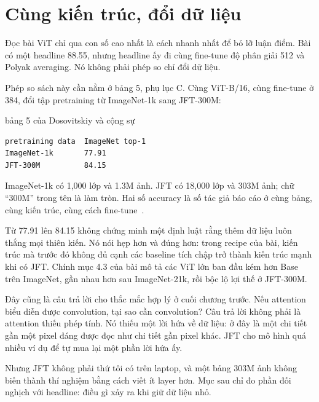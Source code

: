 \section{Cùng kiến trúc, đổi dữ liệu}
\label{sec:ch11-hai-nua-cua-bang}

%
Đọc bài ViT chỉ qua con số cao nhất là cách nhanh nhất để bỏ lỡ luận điểm. Bài
có một headline 88.55, nhưng headline ấy đi cùng fine-tune độ phân giải 512 và
Polyak averaging. Nó không phải phép so chỉ đổi dữ liệu.

Phép so sách này cần nằm ở bảng 5, phụ lục C. Cùng ViT-B/16, cùng fine-tune ở
384, đổi tập pretraining từ ImageNet-1k sang JFT-300M:

\begin{bridge}{bảng 5 của Dosovitskiy và cộng sự}
\begin{verbatim}
pretraining data  ImageNet top-1
ImageNet-1k       77.91
JFT-300M          84.15
\end{verbatim}

ImageNet-1k có 1,000 lớp và 1.3M ảnh. JFT có 18,000 lớp và 303M ảnh; chữ
\enquote{300M} trong tên là làm tròn. Hai số accuracy là số tác giả báo cáo ở
cùng bảng, cùng kiến trúc, cùng cách fine-tune~\autocite{dosovitskiy2021vit}.
\end{bridge}

Từ 77.91 lên 84.15 không chứng minh một định luật rằng thêm dữ liệu luôn thắng
mọi thiên kiến. Nó nói hẹp hơn và đúng hơn: trong recipe của bài, kiến trúc mà
trước đó không đủ cạnh các baseline tích chập trở thành kiến trúc mạnh khi có
JFT. Chính mục 4.3 của bài mô tả các ViT lớn ban đầu kém hơn Base trên
ImageNet, gần nhau hơn sau ImageNet-21k, rồi bộc lộ lợi thế ở JFT-300M.

Đây cũng là câu trả lời cho thắc mắc hợp lý ở cuối chương trước. Nếu attention
biểu diễn được convolution, tại sao cần convolution? Câu trả lời không phải
là attention thiếu phép tính. Nó thiếu một lời hứa về dữ liệu: ở đây là một
chi tiết gần một pixel đáng được đọc như chi tiết gần pixel khác. JFT cho mô
hình quá nhiều ví dụ để tự mua lại một phần lời hứa ấy.

Nhưng JFT không phải thứ tôi có trên laptop, và một bảng 303M ảnh không biến
thành thí nghiệm bằng cách viết ít layer hơn. Mục sau chỉ đo phần đối nghịch
với headline: điều gì xảy ra khi giữ dữ liệu nhỏ.
